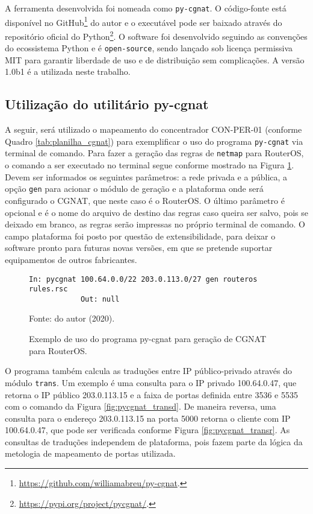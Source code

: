     A ferramenta desenvolvida foi nomeada como {\tt py-cgnat}. O código-fonte está disponível no GitHub\footnote{\url{https://github.com/williamabreu/py-cgnat}.} do autor e o executável pode ser baixado através do repositório oficial do Python\footnote{\url{https://pypi.org/project/pycgnat/}.}. O software foi desenvolvido seguindo as convenções do ecossistema Python e é {\tt open-source}, sendo lançado sob licença permissiva MIT para garantir liberdade de uso e de distribuição sem complicações. A versão 1.0b1 é a utilizada neste trabalho.
    
    
\subsection{Utilização do utilitário py-cgnat}
    
    A seguir, será utilizado o mapeamento do concentrador CON-PER-01 (conforme Quadro \ref{tab:planilha_cgnat}) para exemplificar o uso do programa {\tt py-cgnat} via terminal de comando. Para fazer a geração das regras de {\tt netmap} para RouterOS, o comando a ser executado no terminal segue conforme mostrado na Figura \ref{fig:pycgnat_gen}. Devem ser informados os seguintes parâmetros: a rede privada e a pública, a opção {\tt gen} para acionar o módulo de geração e a plataforma onde será configurado o CGNAT, que neste caso é o RouterOS. O último parâmetro é opcional e é o nome do arquivo de destino das regras caso queira ser salvo, pois se deixado em branco, as regras serão impressas no próprio terminal de comando. O campo plataforma foi posto por questão de extensibilidade, para deixar o software pronto para futuras novas versões, em que se pretende suportar equipamentos de outros fabricantes.
    
    \begin{figure}[!htb]
        \centering
        \caption{Exemplo de uso do programa py-cgnat para geração de CGNAT para RouterOS.} 
        \label{fig:pycgnat_gen}
        
        \begin{Verbatim}[fontsize=\small]
            In: pycgnat 100.64.0.0/22 203.0.113.0/27 gen routeros rules.rsc
            Out: null
        \end{Verbatim} 

        {\small Fonte: do autor (2020).} 
    \end{figure}
    
    O programa também calcula as traduções entre IP público-privado através do módulo {\tt trans}. Um exemplo é uma consulta para o IP privado 100.64.0.47, que retorna o IP público 203.0.113.15 e a faixa de portas definida entre 3536 e 5535 com o comando da Figura \ref{fig:pycgnat_transd}. De maneira reversa, uma consulta para o endereço 203.0.113.15 na porta 5000 retorna o cliente com IP 100.64.0.47, que pode ser verificada conforme Figura \ref{fig:pycgnat_transr}. As consultas de traduções independem de plataforma, pois fazem parte da lógica da metologia de mapeamento de portas utilizada. 
    
